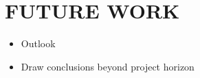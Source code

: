 \chapter{FUTURE WORK}
\label{chapter:method}
\begin{itemize}
\item Outlook
\item Draw conclusions beyond project horizon
\end{itemize}
